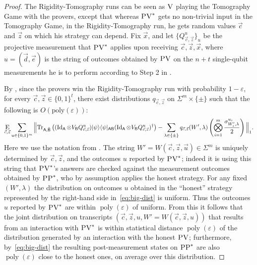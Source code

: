 \documentclass{toc}
\newcommand{\ket}[1]{|#1\rangle}
\newcommand{\bra}[1]{\langle#1|}
\newcommand{\Tr}{\mbox{\rm Tr}}
\newcommand{\Id}{\ensuremath{\mathop{\rm Id}\nolimits}}
\newcommand{\Es}[1]{\ensuremath{\mathop{\textsc{E}}}_{#1}} %
\DeclareMathOperator{\poly}{poly}
\newcommand{\reg}[1]{{\textsf{#1}}}
\newcommand{\eps}{\varepsilon}
\newcommand{\ver}{\textsc{V}}
\newcommand{\pv}{\textsc{PV}}
\newcommand{\pp}{\textsc{PP}}
\begin{document}
\begin{proof}
The Rigidity-Tomography runs can be seen as $\ver$ playing the Tomography Game
  with the provers, except that whereas $\pv^*$ gets no non-trivial input in the
  Tomography Game, in the Rigidity-Tomography run, he gets random values
  $\vec{c}$ and $\vec{z}$ on which his strategy can depend. Fix $\vec{x}$, and let
  $\{Q_{\vec{c},\vec{z}}^{u}\}_{u}$ be the projective measurement that $\pv^*$
  applies upon receiving $\vec{c},\vec{z},\vec{x}$, where  $u = (\vec{d},\vec{e})$ is
  the string of outcomes obtained by $\pv$ on the $n+t$ single-qubit
  measurements he is to perform according to Step 2 in
  . 

By , since the provers win the Rigidity-Tomography run with probability $1-\eps$, for every $\vec{c},\vec{z}\in\{0,1\}^t$,
there exist distributions $q_{\vec{c},\vec{z}}$ on $\Sigma^m\times\{\pm\}$ such that the following is $O(\mathrm{poly}(\eps))$:
\begin{equation}\label{eq:big-dist}
\Es{\vec{c},\vec{z}}\sum_{ u\in \{0, 1\}^m}
\Big\| \Tr_{\reg{A},\hat{\reg{B}}}\left((\Id_{\reg{A}}\otimes V_{\reg{B}} Q_{\vec{c},\vec{z}}^{u})\ket{\psi}\bra{\psi}_{\reg{AB}}(\Id_{\reg{A}}\otimes V_{\reg{B}} Q_{\vec{c},\vec{z}}^{u})^\dagger\right)
- \sum_{\lambda\in\{\pm\}}q_{\vec{c},\vec{z}}(W',\lambda)\left(\bigotimes_{i=1}^m \frac{\sigma^{u_i}_{W_i',\lambda}}{2}\right)\Big\|_1. 
\end{equation}
Here we use the notation from 
. The string
  $W'=W(\vec{c},\vec{z},\vec{u})\in\Sigma^m$ is uniquely determined by
  $\vec{c},\vec{z}$, and the outcomes ${u}$ reported by $\pv^*$; indeed it
  is using this string that $\pv^*$'s answers are checked against the
  measurement outcomes obtained by $\pp^*$, who by assumption applies the
  honest strategy. For any fixed $(W',\lambda)$ the distribution on
  outcomes $u$ obtained in the ``honest'' strategy represented by the right-hand
  side in~\eqref{eq:big-dist} is uniform. Thus the outcomes $u$ reported by
  $\pv^*$ are within $\poly(\eps)$ of uniform. From this it follows that the joint distribution on transcripts $(\vec{c},\vec{z},u,W'=W(\vec{c},\vec{z},u))$ that results from an interaction with $\pv^*$ is within statistical distance $\poly(\eps)$ of the distribution generated by an interaction with the honest $\pv$; furthermore, by~\eqref{eq:big-dist} the resulting post-measurement states on $\pp^*$ are also $\poly(\eps)$ close to the honest ones, on average over this distribution. 


\end{proof}
\end{document}

